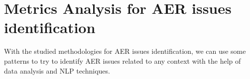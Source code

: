 \chapter{Metrics Analysis for AER issues identification}
\label{cha:metrics_analysis}

With the studied methodologies for AER issues identification, we can use some patterns to try to identify AER issues related to any context with the help of data analysis and NLP techniques.